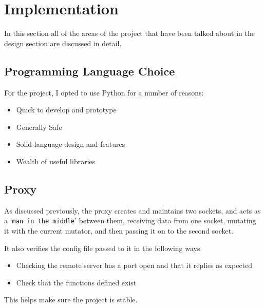 
\section{Implementation}
In this section all of the areas of the project that have been talked about in the design section are discussed in detail.

\subsection{Programming Language Choice}
For the project, I opted to use Python for a number of reasons:
\begin{itemize}
    \item Quick to develop and prototype
    \item Generally Safe
    \item Solid language design and features
    \item Wealth of useful libraries
\end{itemize}

\subsection{Proxy}
As discussed previously, the proxy creates and maintains two sockets, and acts as a `\texttt{man in the middle}' between them, receiving data from one socket, mutating it with the current mutator, and then passing it on to the second socket.\par

It also verifies the config file passed to it in the following ways:
\begin{itemize}
    \item Checking the remote server has a port open and that it replies as expected
    \item Check that the functions defined exist
\end{itemize}
This helps make sure the project is stable.\par

